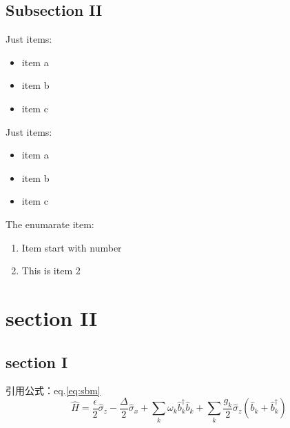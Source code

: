 \documentclass{beamer}
\begin{document}
\subsection{Subsection II }
\begin{frame}
	Just items:
    \begin{itemize}[<+-| alert@+>]
    \item
   item a
    \item 
   item b
    \item
   item c
    \end{itemize}
\end{frame}

\begin{frame}
	Just items:
    \begin{itemize}
    \item
   item a
    \item 
   item b
    \item
   item c
    \end{itemize}
\end{frame}


\begin{frame}
	The enumarate item:
    \begin{enumerate}[<+-| alert@+>]
    \item
	 Item start with number
    \item
     This is item 2
  \end{enumerate}
\end{frame}

\section{section II}
  
\subsection{section I}
\begin{frame}
引用公式：eq.\ref{eq:sbm}
\begin{equation}
\hat{H}=\frac{\epsilon}{2}\hat{\sigma}_{z}-\frac{\Delta}{2}\hat{\sigma}_{x}+\sum_{k}\omega_{k}\hat{b}_{k}^{\dagger}\hat{b}_{k}+\sum_{k}\frac{g_{k}}{2}\hat{\sigma}_{z}(\hat{b}_{k}+\hat{b}_{k}^{\dagger})\label{eq:sbm}
\end{equation}
\end{frame}
\end{document}
